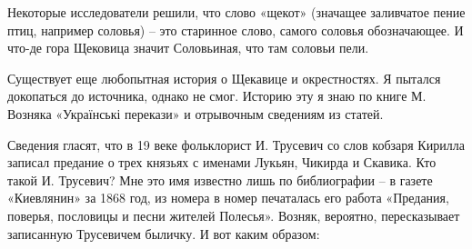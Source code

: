 Некоторые исследователи решили, что слово «щекот» (значащее заливчатое пение птиц, например соловья) – это старинное слово, самого соловья обозначающее. И что-де гора Щековица значит Соловьиная, что там соловьи пели.

Существует еще любопытная история о Щекавице и окрестностях. Я пытался докопаться до источника, однако не смог. Историю эту я знаю по книге М. Возняка «Українські перекази» и отрывочным сведениям из статей.

Сведения гласят, что в 19 веке фольклорист И. Трусевич со слов кобзаря Кирилла записал предание о трех князьях с именами Лукьян, Чикирда и Скавика. Кто такой И. Трусевич? Мне это имя известно лишь по библиографии – в газете «Киевлянин» за 1868 год, из номера в номер печаталась его работа «Предания, поверья, пословицы и песни жителей Полесья». Возняк, вероятно, пересказывает записанную Трусевичем быличку. И вот каким образом:

